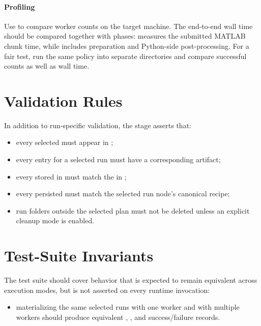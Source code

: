 \documentclass[11pt]{article}
\begin{document}
\paragraph{Profiling}
Use  to compare worker counts on the target machine.
The end-to-end wall time should be compared together with  phases:
 measures the submitted MATLAB chunk time, while  includes preparation and Python-side post-processing.
For a fair test, run the same policy into separate  directories and compare successful  counts as well as wall time.

\section*{Validation Rules}

In addition to run-specific validation, the stage asserts that:

\begin{itemize}
\item every selected  must appear in ;
\item every  entry for a selected run must have a corresponding  artifact;
\item every stored  in  must match the  in ;
\item every persisted  must match the selected run node's canonical recipe;
\item run folders outside the selected plan must not be deleted unless an explicit cleanup mode is enabled.
\end{itemize}

\section*{Test-Suite Invariants}

The test suite should cover behavior that is expected to remain equivalent across execution modes, but is not asserted on every runtime invocation:

\begin{itemize}
\item materializing the same selected runs with one worker and with multiple workers should produce equivalent , , and success/failure records.
\end{itemize}
\end{document}
